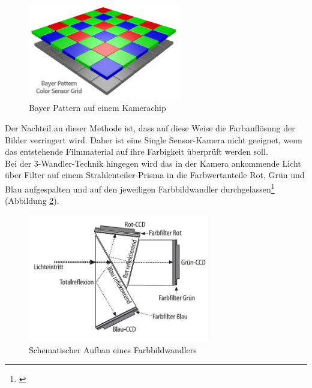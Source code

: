 \begin{figure}[htp]     %
\centering
\includegraphics[width=0.6\textwidth]{bilder/bayer} 
\caption {Bayer Pattern auf einem Kamerachip\protect\footnotemark}\label{b_bayer}
\end{figure}

\noindent Der Nachteil an dieser Methode ist, dass auf diese Weise die Farbauflösung der Bilder verringert wird. Daher ist eine \glqq Single Sensor\grqq -Kamera nicht geeignet, wenn das entstehende Filmmaterial auf ihre Farbigkeit überprüft werden soll.\\
Bei der 3-Wandler-Technik hingegen wird das in der Kamera ankommende Licht über Filter auf einem Strahlenteiler-Prisma in die Farbwertanteile Rot, Grün und Blau aufgespalten und auf den jeweiligen Farbbildwandler durchgelassen\footnote{\cite[378]{schmidt}} (Abbildung \ref{b_wandler}). 

\begin{figure}[H]     %
\centering
\includegraphics[width=0.7\textwidth]{bilder/wandler} 
\caption {Schematischer Aufbau eines Farbbildwandlers\protect\footnotemark}\label{b_wandler}
\end{figure}


